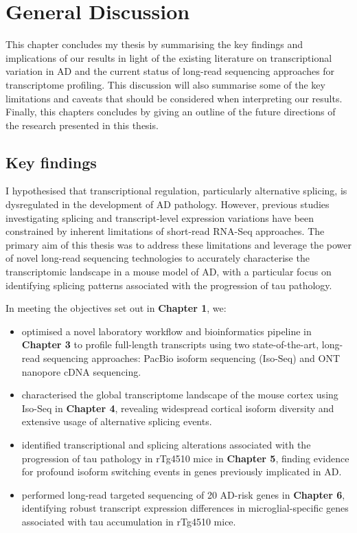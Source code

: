 \chapter{General Discussion}

This chapter concludes my thesis by summarising the key findings and implications of our results in light of the existing literature on transcriptional variation in AD and the current status of long-read sequencing approaches for transcriptome profiling. This discussion will also summarise some of the key limitations and caveats that should be considered when interpreting our results. Finally, this chapters concludes by giving an outline of the future directions of the research presented in this thesis.       

\section{Key findings}
I hypothesised that transcriptional regulation, particularly alternative splicing, is dysregulated in the development of AD pathology. However, previous studies investigating splicing and transcript-level expression variations have been constrained by inherent limitations of short-read RNA-Seq approaches. The primary aim of this thesis was to address these limitations and leverage the power of novel long-read sequencing technologies to accurately characterise the transcriptomic landscape in a mouse model of AD, with a particular focus on identifying splicing patterns associated with the progression of tau pathology.

In meeting the objectives set out in \textbf{Chapter 1}, we:
\begin{itemize}
	\item optimised a novel laboratory workflow and bioinformatics pipeline in \textbf{Chapter 3} to profile full-length transcripts using two state-of-the-art, long-read sequencing approaches: PacBio isoform sequencing (Iso-Seq) and ONT nanopore cDNA sequencing.  
	
	\item characterised the global transcriptome landscape of the mouse cortex using Iso-Seq in \textbf{Chapter 4}, revealing widespread cortical isoform diversity and extensive usage of alternative splicing events. 
	
	\item identified transcriptional and splicing alterations associated with the progression of tau pathology in rTg4510 mice in \textbf{Chapter 5}, finding evidence for profound isoform switching events in genes previously implicated in AD. 
	
	\item performed long-read targeted sequencing of 20 AD-risk genes in \textbf{Chapter 6}, identifying robust transcript expression differences in microglial-specific genes associated with tau accumulation in rTg4510 mice.    
\end{itemize}

